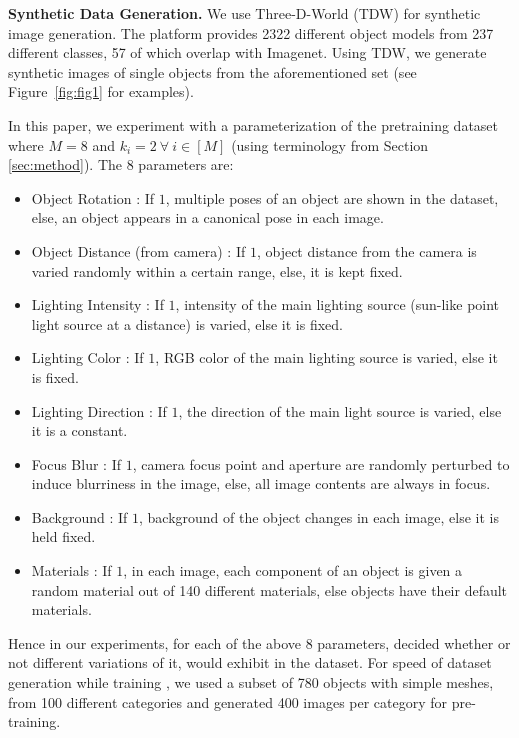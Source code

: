 \vspace{1mm}
\noindent \textbf{Synthetic Data Generation.} We use Three-D-World (TDW) \cite{gan2020threedworld} for synthetic image generation. The platform provides 2322 different object models from 237 different classes, 57 of which overlap with Imagenet. Using TDW, we generate synthetic images of single objects from the aforementioned set (see Figure~\ref{fig:fig1} for examples). 

In this paper, we experiment with a parameterization of the pretraining dataset where $M = 8$ and $k_i = 2 ~\forall~ i \in [M]$ (using terminology from Section \ref{sec:method}). The 8 parameters are: 
\begin{itemize}
\vspace{-0.3em}
\itemsep-0.2em
    \item Object Rotation : If $1$, multiple poses of an object are shown in the dataset, else, an object appears in a canonical pose in each image.
    \item Object Distance (from camera) : If $1$, object distance from the camera is varied randomly within a certain range, else, it is kept fixed.
    \item Lighting Intensity : If $1$, intensity of the main lighting source (sun-like point light source at a distance) is varied, else it is fixed.
    \item Lighting Color : If $1$, RGB color of the main lighting source is varied, else it is fixed.
    \item Lighting Direction : If $1$, the direction of the main light source is varied, else it is a constant.
    \item Focus Blur : If $1$, camera focus point and aperture are randomly perturbed to induce blurriness in the image, else, all image contents are always in focus.
    \item Background : If $1$, background of the object changes in each image, else it is held fixed.
    \item Materials : If $1$, in each image, each component of an object is given a random material out of 140 different materials, else objects have their default materials. 
\end{itemize}
\vspace{-0.5em}
Hence in our experiments, for each of the above 8 parameters, \ours decided whether or not different variations of it, would exhibit in the dataset. For speed of dataset generation while training \ours, we used a subset of 780 objects with simple meshes, from 100 different categories and generated 400 images per category for pre-training.



